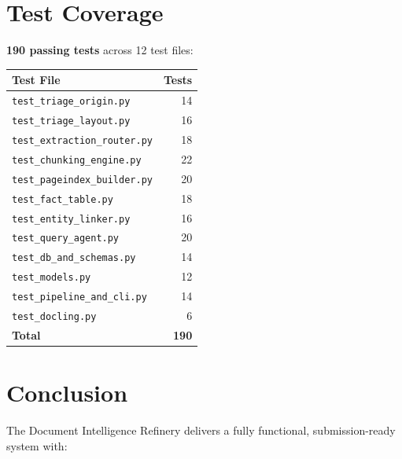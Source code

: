 \documentclass[12pt,a4paper]{article}
\begin{document}
\section{Test Coverage}

\textbf{190 passing tests} across 12 test files:

\begin{center}
\begin{tabular}{lr}
\toprule
\textbf{Test File} & \textbf{Tests} \\
\midrule
\texttt{test\_triage\_origin.py}       & 14 \\
\texttt{test\_triage\_layout.py}       & 16 \\
\texttt{test\_extraction\_router.py}   & 18 \\
\texttt{test\_chunking\_engine.py}     & 22 \\
\texttt{test\_pageindex\_builder.py}   & 20 \\
\texttt{test\_fact\_table.py}          & 18 \\
\texttt{test\_entity\_linker.py}       & 16 \\
\texttt{test\_query\_agent.py}         & 20 \\
\texttt{test\_db\_and\_schemas.py}     & 14 \\
\texttt{test\_models.py}              & 12 \\
\texttt{test\_pipeline\_and\_cli.py}   & 14 \\
\texttt{test\_docling.py}             & 6 \\
\midrule
\textbf{Total}                        & \textbf{190} \\
\bottomrule
\end{tabular}
\end{center}


\section{Conclusion}

The Document Intelligence Refinery delivers a fully functional,
submission-ready system with:
\end{document}
